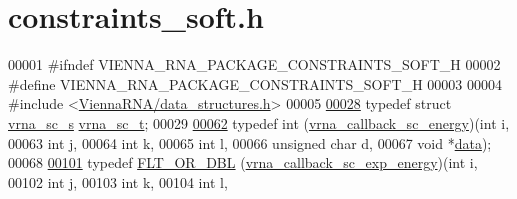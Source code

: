 \hypertarget{constraints__soft_8h_source}{}\section{constraints\+\_\+soft.\+h}
\label{constraints__soft_8h_source}

\begin{DoxyCode}
00001 \textcolor{preprocessor}{#ifndef VIENNA\_RNA\_PACKAGE\_CONSTRAINTS\_SOFT\_H}
00002 \textcolor{preprocessor}{#define VIENNA\_RNA\_PACKAGE\_CONSTRAINTS\_SOFT\_H}
00003 
00004 \textcolor{preprocessor}{#include <\mbox{\hyperlink{data__structures_8h}{ViennaRNA/data\_structures.h}}>}
00005 
\mbox{\hyperlink{group__soft__constraints_ga75401ce219ef8dbcceb672db82d434c6}{00028}} \textcolor{keyword}{typedef} \textcolor{keyword}{struct  }\mbox{\hyperlink{group__soft__constraints_structvrna__sc__s}{vrna\_sc\_s}} \mbox{\hyperlink{group__soft__constraints_structvrna__sc__s}{vrna\_sc\_t}};
00029 
\mbox{\hyperlink{group__soft__constraints_ga88a266695d9e25cc12114dceb7b4565e}{00062}} \textcolor{keyword}{typedef} int (\mbox{\hyperlink{group__soft__constraints_ga88a266695d9e25cc12114dceb7b4565e}{vrna\_callback\_sc\_energy}})(\textcolor{keywordtype}{int}           i,
00063                                       \textcolor{keywordtype}{int}           j,
00064                                       \textcolor{keywordtype}{int}           k,
00065                                       \textcolor{keywordtype}{int}           l,
00066                                       \textcolor{keywordtype}{unsigned} \textcolor{keywordtype}{char} d,
00067                                       \textcolor{keywordtype}{void}          *\mbox{\hyperlink{group__soft__constraints_a7574680143df97b9029146c2150bf06d}{data}});
00068 
\mbox{\hyperlink{group__soft__constraints_ga4099978d410513edeeff8f3db13144c5}{00101}} \textcolor{keyword}{typedef} \mbox{\hyperlink{group__data__structures_ga31125aeace516926bf7f251f759b6126}{FLT\_OR\_DBL}} (\mbox{\hyperlink{group__soft__constraints_ga4099978d410513edeeff8f3db13144c5}{vrna\_callback\_sc\_exp\_energy}})(\textcolor{keywordtype}{int}            i,
00102                                                  \textcolor{keywordtype}{int}            j,
00103                                                  \textcolor{keywordtype}{int}            k,
00104                                                  \textcolor{keywordtype}{int}            l,

\end{DoxyCode}
